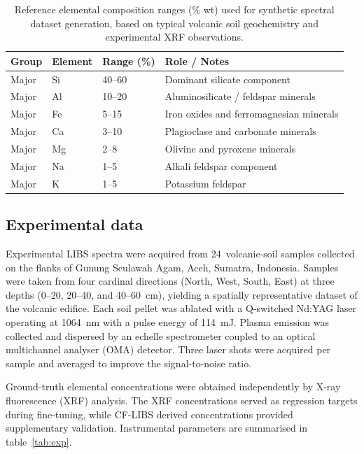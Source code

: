 \documentclass{iopjournal}
\begin{document}
\begin{table}[htbp]
\centering
\caption{Reference elemental composition ranges (\% wt) used for synthetic spectral dataset generation, based on typical volcanic soil geochemistry and experimental XRF observations.}
\label{tab:comp}
\begin{tabular}{llll}
\toprule
Group & Element & Range (\%) & Role / Notes \\
\midrule
Major & Si & 40--60 & Dominant silicate component \\
Major & Al & 10--20 & Aluminosilicate / feldspar minerals \\
Major & Fe & 5--15  & Iron oxides and ferromagnesian minerals \\
Major & Ca & 3--10  & Plagioclase and carbonate minerals \\
Major & Mg & 2--8   & Olivine and pyroxene minerals \\
Major & Na & 1--5   & Alkali feldspar component \\
Major & K  & 1--5   & Potassium feldspar \\
\bottomrule
\end{tabular}
\end{table}


\subsection{Experimental data} \label{sec:exp}

Experimental LIBS spectra were acquired from 24~volcanic-soil samples collected on the flanks of Gunung Seulawah Agam, Aceh, Sumatra, Indonesia.
Samples were taken from four cardinal directions (North, West, South, East) at three depths (0--20, 20--40, and 40--60~cm), yielding a spatially representative dataset of the volcanic edifice.
Each soil pellet was ablated with a Q-switched Nd:YAG laser operating at 1064~nm with a pulse energy of 114~mJ.
Plasma emission was collected and dispersed by an echelle spectrometer coupled to an optical multichannel analyser (OMA) detector.
Three laser shots were acquired per sample and averaged to improve the signal-to-noise ratio.

Ground-truth elemental concentrations were obtained independently by X-ray fluorescence (XRF) analysis.
The XRF concentrations served as regression targets during fine-tuning, while CF-LIBS derived concentrations \cite{cristoforetti_local_2010} provided supplementary validation.
Instrumental parameters are summarised in table~\ref{tab:exp}.
\end{document}
